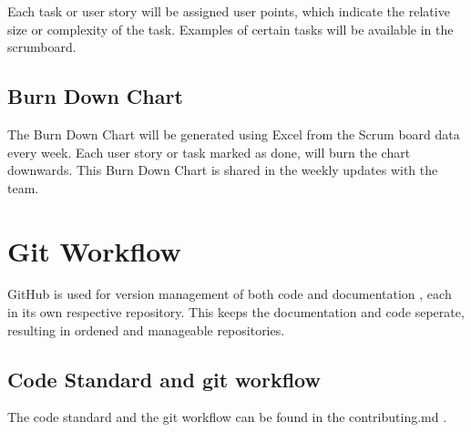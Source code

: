 \documentclass{projdoc}
\begin{document}
Each task or user story will be assigned user points, which indicate the relative size or complexity of the task. Examples of certain tasks will be available in the scrumboard.

\subsection{Burn Down Chart}

The Burn Down Chart will be generated using Excel from the Scrum board data every
week. Each user story or task marked as done, will burn the chart downwards. This
Burn Down Chart is shared in the weekly updates with the team.

\section{Git Workflow}

GitHub is used for version management of both code \autocite{crepe:code-repo} and
documentation \autocite{crepe:docs-repo}, each in its own respective repository. This
keeps the documentation and code seperate, resulting in ordened and manageable
repositories.

\subsection{Code Standard and git workflow}

The code standard and the git workflow can be found in the contributing.md \autocite{crepe:code-standard}.
\end{document}
